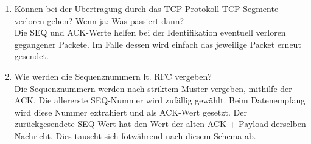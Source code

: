 \documentclass[11pt]{article}
\begin{document}
\begin{enumerate}[$\bullet$]
        \item Können bei der Übertragung durch das TCP-Protokoll TCP-Segmente verloren gehen? Wenn ja: Was
        passiert dann?\\
        Die SEQ und ACK-Werte helfen bei der Identifikation eventuell verloren gegangener Packete. Im Falle dessen wird
        einfach das jeweilige Packet erneut gesendet.

        \item Wie werden die Sequenznummern lt. RFC vergeben?\\
        Die Sequenznummern werden nach striktem Muster vergeben, mithilfe der ACK.
        Die allererste SEQ-Nummer wird zufällig gewählt. Beim Datenempfang wird diese Nummer extrahiert und als ACK-Wert
        gesetzt. Der zurückgesendete SEQ-Wert hat den Wert der alten ACK + Payload derselben Nachricht.
        Dies tauscht sich fotwährend nach diesem Schema ab.
    \end{enumerate}
\end{document}
